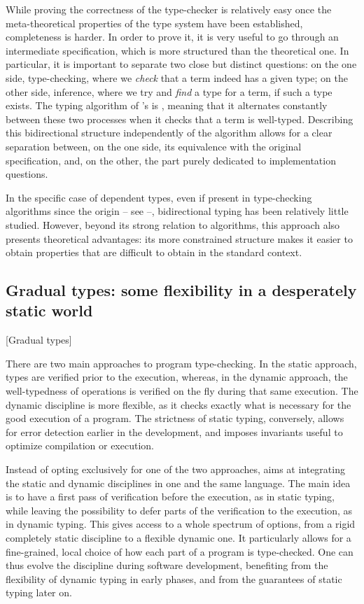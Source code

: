 While proving the correctness of the type-checker is relatively easy once the
meta-theoretical properties of the type system have been established, completeness is harder.
In order to prove it, it is very useful to go through an intermediate specification,
which is more structured than the theoretical one.
In particular, it is important to separate two close but distinct questions:
on the one side, type-checking, where we \emph{check} that a term indeed has a
given type;
on the other side, inference, where we try and \emph{find} a type for a term, if such a
type exists.
The typing algorithm of 's  is , meaning that it
alternates constantly between these two processes when it checks that a term is well-typed.
Describing this bidirectional structure independently of the algorithm allows for a
clear separation between, on the one side, its equivalence with the original specification,
and, on the other, the part purely dedicated to implementation questions.

In the specific case of dependent types, even if present in type-checking algorithms since
the origin – see \eg {} –, bidirectional typing has been relatively little
studied. However, beyond its strong relation to algorithms, this approach also presents
theoretical advantages: its more constrained structure makes it easier
to obtain properties that are difficult to obtain in the standard context.

\subsection{Gradual types: some flexibility in a desperately static world}
  [Gradual types]
\label{sec:intro-graduel-en}

There are two main approaches to program type-checking. In the static approach,%
types are verified prior to the execution, whereas, in the dynamic approach, the well-typedness
of operations is verified on the fly during that same execution.
The dynamic discipline is more flexible, as it checks exactly what is necessary
for the good execution of a program.
The strictness of static typing, conversely, allows for error detection earlier in the
development, and imposes invariants useful to optimize compilation or execution.

Instead of opting exclusively for one of the two approaches,
  aims at integrating
the static and dynamic disciplines in one and the
same language.
The main idea is to have a first pass of verification before the execution, as in static typing,
while leaving the possibility to defer parts of the verification to the execution, as in
dynamic typing.
This gives access to a whole spectrum of options, from a rigid completely static
discipline to a flexible dynamic one. It particularly allows for a fine-grained, local choice
of how each part of a program is type-checked.
One can thus evolve the discipline during software development, benefiting from
the flexibility of dynamic typing in early phases, and from the guarantees of static typing
later on.

